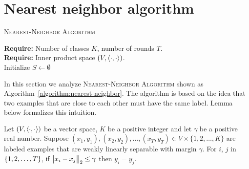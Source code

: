\section{Nearest neighbor algorithm}
\label{section:nearest-neighbor-algorithm}

\begin{algorithm}[H]
\SetAlgoLined
\LinesNumbered
\caption{\textsc{Nearest-Neighbor Algorithm}
\label{algorithm:nearest-neighbor}
}
\textbf{Require:} Number of classes $K$, number of rounds $T$. \\
\textbf{Require:} Inner product space $(V,\left\langle \cdot, \cdot \right\rangle)$. \\
\nl Initialize $S \gets \emptyset$ \\
\nl {}
\end{algorithm}

In this section we analyze \textsc{Nearest-Neighbor Algorithm} shown as
Algorithm~\ref{algorithm:nearest-neighbor}. The algorithm is based on the idea
that two examples that are close to each other must have the same label. Lemma
below formalizes this intuition.

\begin{lemma}
\label{lemma:nearest-neighbor}
Let $(V,\left\langle \cdot, \cdot \right\rangle)$ be a vector space, $K$ be a positive integer and let
$\gamma$ be a positive real number. Suppose $(x_1,y_1), (x_2,y_2), \dots, (x_T,
y_T) \in V \times \{1,2,\dots,K\}$ are labeled examples that are weakly linearly
separable with margin $\gamma$. For $i$, $j$ in $\cbr{1,2,\dots,T}$, if
$\norm{x_i - x_j}_2 \le \gamma$ then $y_i = y_j$.
\end{lemma}

